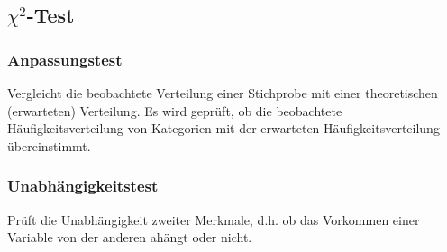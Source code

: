 \subsection{\(\chi^2\)-Test}

\subsubsection{Anpassungstest}

Vergleicht die beobachtete Verteilung einer Stichprobe mit einer theoretischen (erwarteten) Verteilung. Es wird geprüft, ob die beobachtete Häufigkeitsverteilung von Kategorien mit der erwarteten Häufigkeitsverteilung übereinstimmt.

\subsubsection{Unabhängigkeitstest}

Prüft die Unabhängigkeit zweiter Merkmale, d.h. ob das Vorkommen einer Variable von der anderen ahängt oder nicht.